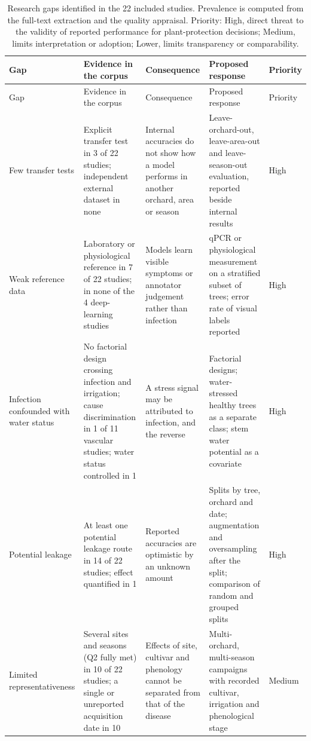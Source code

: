 \documentclass[preprint,12pt]{elsarticle}
\begin{document}
\begin{landscape}
\scriptsize\setlength\tabcolsep{3pt}\renewcommand{\arraystretch}{1.15}
\begin{longtable}{@{}L{3.22cm}L{4.48cm}L{4.29cm}L{5.07cm}L{1.17cm}@{}}
\caption{Research gaps identified in the 22 included studies. Prevalence is computed from the full-text extraction and the quality appraisal. Priority: High, direct threat to the validity of reported performance for plant-protection decisions; Medium, limits interpretation or adoption; Lower, limits transparency or comparability.}\label{tab:gap}\\
\toprule
Gap & Evidence in the corpus & Consequence & Proposed response & Priority\\\midrule\endfirsthead
\toprule
Gap & Evidence in the corpus & Consequence & Proposed response & Priority\\\midrule\endhead
\bottomrule\endfoot
Few transfer tests & Explicit transfer test in 3 of 22 studies; independent external dataset in none & Internal accuracies do not show how a model performs in another orchard, area or season & Leave-orchard-out, leave-area-out and leave-season-out evaluation, reported beside internal results & High\\[2pt]
Weak reference data & Laboratory or physiological reference in 7 of 22 studies; in none of the 4 deep-learning studies & Models learn visible symptoms or annotator judgement rather than infection & qPCR or physiological measurement on a stratified subset of trees; error rate of visual labels reported & High\\[2pt]
Infection confounded with water status & No factorial design crossing infection and irrigation; cause discrimination in 1 of 11 vascular studies; water status controlled in 1 & A stress signal may be attributed to infection, and the reverse & Factorial designs; water-stressed healthy trees as a separate class; stem water potential as a covariate & High\\[2pt]
Potential leakage & At least one potential leakage route in 14 of 22 studies; effect quantified in 1 & Reported accuracies are optimistic by an unknown amount & Splits by tree, orchard and date; augmentation and oversampling after the split; comparison of random and grouped splits & High\\[2pt]
Limited representativeness & Several sites and seasons (Q2 fully met) in 10 of 22 studies; a single or unreported acquisition date in 10 & Effects of site, cultivar and phenology cannot be separated from that of the disease & Multi-orchard, multi-season campaigns with recorded cultivar, irrigation and phenological stage & Medium\\[2pt]

\end{longtable}
\end{landscape}
\end{document}
